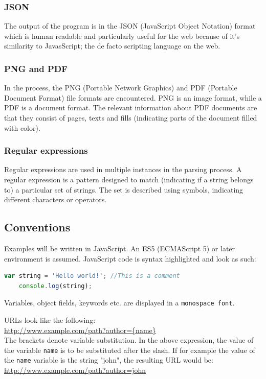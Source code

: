 \documentclass{article}
\begin{document}
	\subsubsection{JSON}
	The output of the program is in the JSON (JavaScript Object Notation) format which is human readable and particularly useful for the web because of it's similarity to JavasScript; the de facto scripting language on the web.\cite{wikipedia json}
	
	\subsubsection{PNG and PDF}
	In the process, the PNG (Portable Network Graphics) and PDF (Portable Document Format) file formats are encountered. PNG is an image format, while a PDF is a document format. The relevant information about PDF documents are that they consist of pages, texts and fills (indicating parts of the document filled with color).\cite{wikipedia png}\cite{wikipedia pdf}
	
	\subsubsection{Regular expressions}
	Regular expressions are used in multiple instances in the parsing process. A regular expression is a pattern designed to match (indicating if a string belongs to) a particular set of strings. The set is described using symbols, indicating different characters or operators.\cite{wikipedia regex}
	
	\subsection{Conventions}
	Examples will be written in JavaScript. An ES5 (ECMAScript 5) or later environment is assumed. JavaScript code is syntax highlighted and look as such:
	\begin{lstlisting}[language=JavaScript]
	var string = 'Hello world!'; //This is a comment
	console.log(string);
	\end{lstlisting}
	
	Variables, object fields, keywords etc. are displayed in a \texttt{monospace font}.
	
	URLs look like the following:\\
	\url{http://www.example.com/path?author={name}}\\
	The brackets denote variable substitution. In the above expression, the value of the variable \texttt{name} is to be substituted after the slash. If for example the value of the \texttt{name} variable is the string "john", the resulting URL would be:\\
	\url{http://www.example.com/path?author=john}
	
\end{document}
